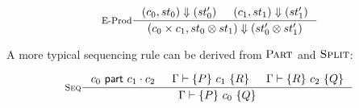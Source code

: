 \documentclass{article}
\newcommand{\triple}[3]{\{#1\}~#2~\{#3\}}
\newcommand{\ppart}[3]{#1~\textsf{part}~#2\cdot#3}
\newcommand{\judges}{\vdash}
\newcommand{\judgement}[4]{#1 \judges \triple{#2}{#3}{#4}}
\begin{document}
\begin{spreadlines}{10pt}
\begin{gather*}
  \inference[E-Prod]{%
    (c_0, st_0) \Downarrow (st_0')&
    (c_1, st_1) \Downarrow (st_1')
  }{%
    (c_0 \times c_1, st_0 \otimes st_1) \Downarrow (st_0' \otimes st_1')
  }
\end{gather*}
\end{spreadlines}

A more typical sequencing rule can be derived from $\textsc{Part}$ and
$\textsc{Split}$:

\[
  \inference[\textsc{Seq}]{%
    \ppart{c_0}{c_1}{c_2}&
    \judgement{\Gamma}{P}{c_1}{R}&
    \judgement{\Gamma}{R}{c_2}{Q}
  }{%
    \judgement{\Gamma}{P}{c_0}{Q}
  }
\]
\end{document}
